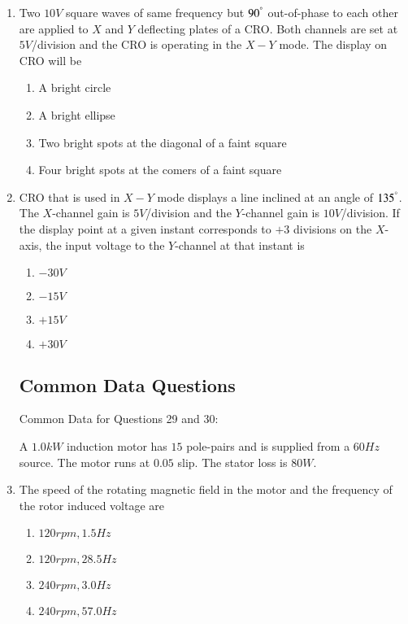 \documentclass[journal]{IEEEtran}
\begin{document}
\begin{enumerate}
    \item Two $10V$ square waves of same frequency but $90^\degree$ out-of-phase to each other are applied to $X$ and $Y$ deflecting plates of a CRO. Both channels are set at $5V$/division and the CRO is operating in the $X-Y$ mode. The display on CRO will be 
        \begin{enumerate}
            \item A bright circle
            \item A bright ellipse
            \item Two bright spots at the diagonal of a faint square
            \item Four bright spots at the comers of a faint square
        \end{enumerate}

    \item CRO that is used in $X-Y$ mode displays a line inclined at an angle of $135^\degree$. The $X$-channel gain is $5V$/division and the $Y$-channel gain is $10V$/division. If the display point at a given instant corresponds to $+3$ divisions on the $X$-axis, the input voltage to the $Y$-channel at that instant is 
        \begin{enumerate}
            \item $-30V$
            \item $-15V$
            \item $+15V$
            \item $+30V$
        \end{enumerate}

\subsection*{Common Data Questions}

Common Data for Questions 29 and 30:

A $1.0kW$ induction motor has $15$ pole-pairs and is supplied from a $60Hz$ source. The motor runs at $0.05$ slip. The stator loss is $80W$.
    
    \item The speed of the rotating magnetic field in the motor and the frequency of the rotor induced voltage are
        \begin{enumerate}
            \item $120rpm, 1.5Hz$
            \item $120rpm, 28.5Hz$
            \item $240rpm, 3.0Hz$
            \item $240rpm, 57.0Hz$
        \end{enumerate}


\end{enumerate}
\end{document}
